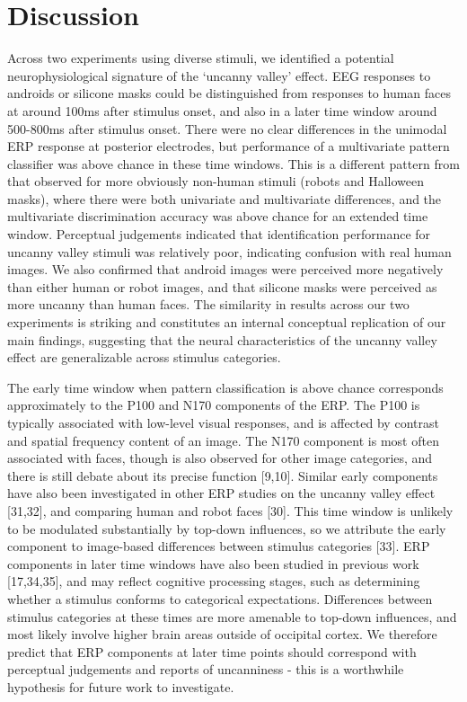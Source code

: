 \documentclass[
]{article}
\begin{document}
\section{Discussion}\label{discussion}

Across two experiments using diverse stimuli, we identified a potential neurophysiological signature of the `uncanny valley' effect. EEG responses to androids or silicone masks could be distinguished from responses to human faces at around 100ms after stimulus onset, and also in a later time window around 500-800ms after stimulus onset. There were no clear differences in the unimodal ERP response at posterior electrodes, but performance of a multivariate pattern classifier was above chance in these time windows. This is a different pattern from that observed for more obviously non-human stimuli (robots and Halloween masks), where there were both univariate and multivariate differences, and the multivariate discrimination accuracy was above chance for an extended time window. Perceptual judgements indicated that identification performance for uncanny valley stimuli was relatively poor, indicating confusion with real human images. We also confirmed that android images were perceived more negatively than either human or robot images, and that silicone masks were perceived as more uncanny than human faces. The similarity in results across our two experiments is striking and constitutes an internal conceptual replication of our main findings, suggesting that the neural characteristics of the uncanny valley effect are generalizable across stimulus categories.

The early time window when pattern classification is above chance corresponds approximately to the P100 and N170 components of the ERP. The P100 is typically associated with low-level visual responses, and is affected by contrast and spatial frequency content of an image. The N170 component is most often associated with faces, though is also observed for other image categories, and there is still debate about its precise function {[}9,10{]}. Similar early components have also been investigated in other ERP studies on the uncanny valley effect {[}31,32{]}, and comparing human and robot faces {[}30{]}. This time window is unlikely to be modulated substantially by top-down influences, so we attribute the early component to image-based differences between stimulus categories {[}33{]}. ERP components in later time windows have also been studied in previous work {[}17,34,35{]}, and may reflect cognitive processing stages, such as determining whether a stimulus conforms to categorical expectations. Differences between stimulus categories at these times are more amenable to top-down influences, and most likely involve higher brain areas outside of occipital cortex. We therefore predict that ERP components at later time points should correspond with perceptual judgements and reports of uncanniness - this is a worthwhile hypothesis for future work to investigate.
\end{document}
